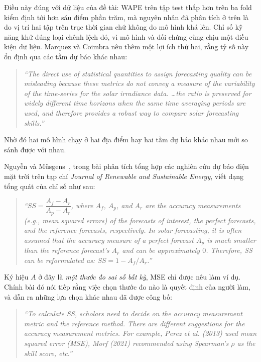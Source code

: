 Điều này đúng với dữ liệu của đề tài: WAPE trên tập test thấp hơn trên ba fold kiểm định tới hơn
sáu điểm phần trăm, mà nguyên nhân đã phân tích ở trên là do vị trí hai tập trên trục thời gian
chứ không do mô hình khá lên. Chỉ số kỹ năng khử đúng loại chênh lệch đó, vì mô hình và đối
chứng cùng chịu một điều kiện dữ liệu. Marquez và Coimbra nêu thêm một lợi ích thứ hai, rằng tỷ
số này ổn định qua các tầm dự báo khác nhau:

\begin{quote}\small
\textit{``The direct use of statistical quantities to assign forecasting quality can be
misleading because these metrics do not convey a measure of the variability of the time-series
for the solar irradiance data. \dots the ratio is preserved for widely different time horizons
when the same time averaging periods are used, and therefore provides a robust way to compare
solar forecasting skills.''}
\end{quote}

Nhờ đó hai mô hình chạy ở hai địa điểm hay hai tầm dự báo khác nhau mới so sánh được với nhau.

Nguyễn và Müsgens~\cite{nguyen2026meta}, trong bài phân tích tổng hợp các nghiên cứu dự báo điện
mặt trời trên tạp chí \textit{Journal of Renewable and Sustainable Energy}, viết dạng tổng quát
của chỉ số như sau:

\begin{quote}\small
\textit{``$SS = \dfrac{A_f - A_r}{A_p - A_r}$, where $A_f$, $A_p$, and $A_r$ are the accuracy
measurements (e.g., mean squared errors) of the forecasts of interest, the perfect forecasts, and
the reference forecasts, respectively. In solar forecasting, it is often assumed that the accuracy
measure of a perfect forecast $A_p$ is much smaller than the reference forecast's $A_r$ and can be
approximately $0$. Therefore, SS can be reformulated as: $SS = 1 - A_f/A_r$.''}
\end{quote}

Ký hiệu $A$ ở đây là \textit{một thước đo sai số bất kỳ}, MSE chỉ được nêu làm ví dụ. Chính bài
đó nói tiếp rằng việc chọn thước đo nào là quyết định của người làm, và dẫn ra những lựa chọn
khác nhau đã được công bố:

\begin{quote}\small
\textit{``To calculate SS, scholars need to decide on the accuracy measurement metric and the
reference method. There are different suggestions for the accuracy measurement metrics. For
example, Perez et al. (2013) used mean squared error (MSE), Morf (2021) recommended using
Spearman's $\rho$ as the skill score, etc.''}
\end{quote}


